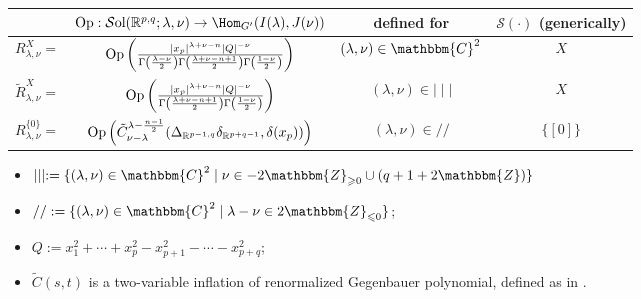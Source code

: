 \renewcommand{\arraystretch}{3.5}
\scriptsize
\begin{center}
\begin{tabular}{|c|c|c|c|}
  \hline
  & $\tmop{Op}:\Sol(\mathbb{R}^{p,q};\lambda,\nu)\to\Hom_{G'}(I(\lambda),J(\nu))$ & defined for &
  $\mathcal{S} (\cdot)$ (generically)\\
  \hline
  $R_{\lambda, \nu}^X=$ & $\mbox{\normalfont Op}\left( \frac{| x_p |^{\lambda + \nu - n} | Q |^{-
  \nu}}{\Gamma \left( \frac{\lambda - \nu}{2} \right) \Gamma \left(
  \frac{\lambda + \nu - n + 1}{2} \right) \Gamma \left( \frac{1 - \nu}{2}
  \right)} \right)$ & $(\lambda,\nu)\in\mathbbm{C}^2$ & $X$\\
  \hline
  $\tilde{R}^X_{\lambda, \nu}=$ & $\mbox{\normalfont Op}\left(  \frac{| x_p |^{\lambda + \nu - n} | Q |^{-
  \nu}}{ \Gamma \left(
  \frac{\lambda + \nu - n + 1}{2} \right) \Gamma \left( \frac{1 - \nu}{2}
  \right)} \right)$ & $(\lambda,\nu)\in\mid \mid \mid$ & $X$\\
  \hline
  $R_{\lambda, \nu}^{\{ 0 \}}=$ & $\mbox{\normalfont Op}\left(  \tilde{C}_{\nu - \lambda}^{\lambda - \frac{n
  - 1}{2}} ({\Delta}_{\mathbb{R}^{p-1,q}} {\delta}_{\mathbb{R}^{p+q-1}}, \delta (x_p)) \right)$ & $(\lambda,\nu)\in/ /$ & $\{ [0]
  \}$\\
  \hline
\end{tabular}
\end{center}
\vspace{-1em}
\begin{itemize}
	\item $\mid \mid \mid \assign \{ (\lambda, \nu) \in \mathbbm{C}^2 \mid \nu \in
	- 2\mathbbm{Z}_{\geqslant 0} \cup (q + 1 + 2\mathbbm{Z}) \}$ \item $/ / \assign
\{ (\lambda, \nu) \in \mathbbm{C}^2 \mid \lambda - \nu \in
2\mathbbm{Z}_{\leqslant 0} \}$;
\item $Q:=x_1^2+\cdots+x_p^2-x_{p+1}^2-\cdots-x_{p+q}^2$;
\item $\tilde{C}(s,t)$ is a two-variable inflation of renormalized Gegenbauer polynomial, defined as in \cite{kobayashi2015symmetry}.
\end{itemize}
